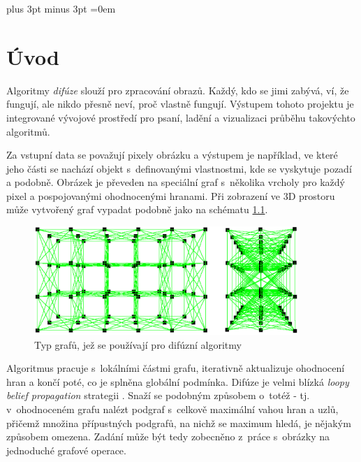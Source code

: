 \documentclass[11pt,twoside,a4paper]{book}
\begin{document}

\cleardoublepage

\tableofcontents
\listoffigures
\listoftables



\mainbodystarts

\parskip=5pt plus 3pt minus 3pt
\parindent=0em



\chapter{Úvod}

Algoritmy \textit{difúze} \cite{werner} slouží pro zpracování obrazů. Každý, kdo se jimi zabývá, ví, že fungují, ale nikdo přesně neví, proč vlastně fungují. Výstupem tohoto projektu je integrované vývojové prostředí pro psaní, ladění a vizualizaci průběhu takovýchto algoritmů.

Za vstupní data se považují pixely obrázku a výstupem je například, ve které jeho části se nachází objekt s~definovanými vlastnostmi, kde se vyskytuje pozadí a podobně. Obrázek je převeden na speciální graf s~několika vrcholy pro každý pixel a pospojovanými ohodnocenými hranami. Při zobrazení ve 3D prostoru může vytvořený graf vypadat podobně jako na schématu \ref{fig:graf_difuze}.

\begin{figure}[ht]
\begin{center}
\includegraphics[width=10cm]{img/graf_difuze.pdf}
\caption{Typ grafů, jež se používají pro difúzní algoritmy}
\label{fig:graf_difuze}
\end{center}
\end{figure}

Algoritmus pracuje s~lokálními částmi grafu, iterativně aktualizuje ohodnocení hran a končí poté, co je splněna globální podmínka. Difúze je velmi blízká \textit{loopy belief propagation} strategii \cite{belief_propagation}. Snaží se podobným způsobem o~totéž - tj. v~ohodnoceném grafu nalézt podgraf s~celkově maximální vahou hran a uzlů, přičemž množina přípustných podgrafů, na nichž se maximum hledá, je nějakým způsobem omezena. Zadání může být tedy zobecněno z~práce s~obrázky na jednoduché grafové operace.
\end{document}
